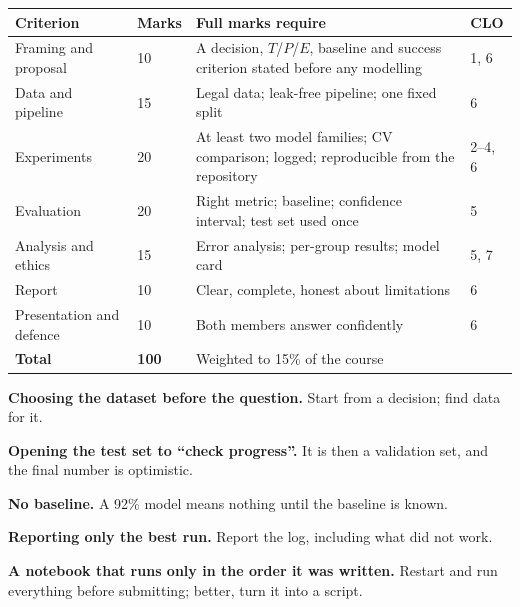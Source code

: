 \begin{longtable}{@{}L{4.4cm}L{1.3cm}L{7.4cm}L{1.6cm}@{}}
\toprule
{}
\textbf{Criterion} & \textbf{Marks} & \textbf{Full marks require} & \textbf{CLO} \\
\midrule
\endhead
Framing and proposal & 10 & A decision, $T$/$P$/$E$, baseline and success criterion
stated before any modelling & 1, 6 \\
Data and pipeline & 15 & Legal data; leak-free pipeline; one fixed split & 6 \\
Experiments & 20 & At least two model families; CV comparison; logged; reproducible from
the repository & 2--4, 6 \\
Evaluation & 20 & Right metric; baseline; confidence interval; test set used once & 5 \\
Analysis and ethics & 15 & Error analysis; per-group results; model card & 5, 7 \\
Report & 10 & Clear, complete, honest about limitations & 6 \\
Presentation and defence & 10 & Both members answer confidently & 6 \\
\midrule
\textbf{Total} & \textbf{100} & Weighted to 15\% of the course & \\
\bottomrule
\end{longtable}

\begin{pitfall}
\begin{tight}
  \item \textbf{Choosing the dataset before the question.} Start from a decision;
        find data for it.
  \item \textbf{Opening the test set to ``check progress''.} It is then a validation
        set, and the final number is optimistic.
  \item \textbf{No baseline.} A 92\% model means nothing until the baseline is known.
  \item \textbf{Reporting only the best run.} Report the log, including what did not
        work.
  \item \textbf{A notebook that runs only in the order it was written.} Restart and run
        everything before submitting; better, turn it into a script.
\end{tight}
\end{pitfall}

